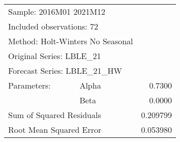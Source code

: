 \begin{tabular}{lrrrr}
\toprule
\multicolumn{3}{l}{Sample: 2016M01 2021M12}&\multicolumn{1}{c}{}&\multicolumn{1}{c}{}\\
\multicolumn{3}{l}{Included observations: 72}&\multicolumn{1}{c}{}&\multicolumn{1}{c}{}\\
\multicolumn{4}{l}{Method: Holt-Winters No Seasonal}&\multicolumn{1}{c}{}\\
\multicolumn{3}{l}{Original Series: LBLE\_21}&\multicolumn{1}{c}{}&\multicolumn{1}{c}{}\\
\multicolumn{3}{l}{Forecast Series: LBLE\_21\_HW}&\multicolumn{1}{c}{}&\multicolumn{1}{c}{}\\
\midrule
\multicolumn{1}{l}{Parameters:}&\multicolumn{1}{l}{Alpha}&\multicolumn{1}{c}{}&\multicolumn{1}{c}{}&\multicolumn{1}{r}{0.7300}\\
\multicolumn{1}{c}{}&\multicolumn{1}{l}{Beta}&\multicolumn{1}{c}{}&\multicolumn{1}{c}{}&\multicolumn{1}{r}{0.0000}\\
\multicolumn{3}{l}{Sum of Squared Residuals}&\multicolumn{1}{c}{}&\multicolumn{1}{r}{0.209799}\\
\multicolumn{3}{l}{Root Mean Squared Error}&\multicolumn{1}{c}{}&\multicolumn{1}{r}{0.053980}\\
\bottomrule
\end{tabular}
